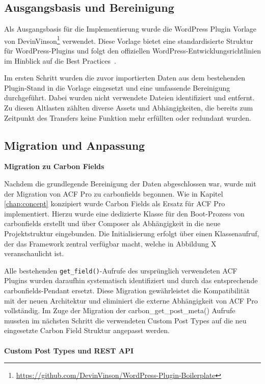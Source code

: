 \subsection{Ausgangsbasis und Bereinigung}

Als Ausgangsbasis für die Implementierung wurde die WordPress Plugin Vorlage von DevinVinson\footnote{\url{https://github.com/DevinVinson/WordPress-Plugin-Boilerplate}} verwendet.
Diese Vorlage bietet eine standardisierte Struktur für WordPress-Plugins und folgt den offiziellen WordPress-Entwicklungsrichtlinien im Hinblick auf die Best Practices~\cite{wordpress2025BSP}.

Im ersten Schritt wurden die zuvor importierten Daten aus dem bestehenden Plugin-Stand in die Vorlage eingesetzt und eine umfassende Bereinigung durchgeführt.
Dabei wurden nicht verwendete Dateien identifiziert und entfernt.
Zu diesen Altlasten zählten diverse Assets und Abhängigkeiten, die bereits zum Zeitpunkt des Transfers keine Funktion mehr erfüllten oder redundant wurden.
\subsection{Migration und Anpassung}
\textbf{Migration zu Carbon Fields}

Nachdem die grundlegende Bereinigung der Daten abgeschlossen war, wurde mit der Migration von ACF Pro zu \gls{carbonfields} begonnen.
Wie in Kapitel \ref{chap:concept} konzipiert wurde Carbon Fields als Ersatz für ACF Pro implementiert.
Hierzu wurde eine dedizierte Klasse für den Boot-Prozess von \gls{carbonfields} erstellt und über Composer als Abhängigkeit in die neue Projektstruktur eingebunden.
Die Initialisierung erfolgt über einen Klassenaufruf, der das Framework zentral verfügbar macht, welche in Abbildung X veranschaulicht ist. %

Alle bestehenden \texttt{get\_field()}-Aufrufe des ursprünglich verwendeten ACF Plugins wurden daraufhin systematisch identifiziert und durch das entsprechende \gls{carbonfields}-Pendant ersetzt.
Diese Migration gewährleistet die Kompatibilität mit der neuen Architektur und eliminiert die externe Abhängigkeit von ACF Pro vollständig.
Im Zuge der Migration der carbon\_get\_post\_meta() Aufrufe mussten im nächsten Schritt die verwendeten Custom Post Types auf die neu eingesetzte Carbon Field Struktur angepasst werden.
\\\\
\textbf{Custom Post Types und REST API}

